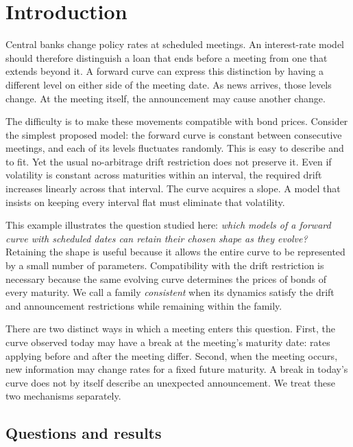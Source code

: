 \section{Introduction}
Central banks change policy rates at scheduled meetings. An interest-rate model should therefore distinguish a loan that ends before a meeting from one that extends beyond it. A forward curve can express this distinction by having a different level on either side of the meeting date. As news arrives, those levels change. At the meeting itself, the announcement may cause another change.

The difficulty is to make these movements compatible with bond prices. Consider the simplest proposed model: the forward curve is constant between consecutive meetings, and each of its levels fluctuates randomly. This is easy to describe and to fit. Yet the usual no-arbitrage drift restriction does not preserve it. Even if volatility is constant across maturities within an interval, the required drift increases linearly across that interval. The curve acquires a slope. A model that insists on keeping every interval flat must eliminate that volatility.

This example illustrates the question studied here: \emph{which models of a forward curve with scheduled dates can retain their chosen shape as they evolve?} Retaining the shape is useful because it allows the entire curve to be represented by a small number of parameters. Compatibility with the drift restriction is necessary because the same evolving curve determines the prices of bonds of every maturity. We call a family \emph{consistent} when its dynamics satisfy the drift and announcement restrictions while remaining within the family.

There are two distinct ways in which a meeting enters this question. First, the curve observed today may have a break at the meeting's maturity date: rates applying before and after the meeting differ. Second, when the meeting occurs, new information may change rates for a fixed future maturity. A break in today's curve does not by itself describe an unexpected announcement. We treat these two mechanisms separately.

\subsection{Questions and results}
